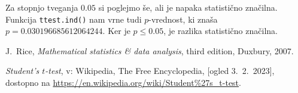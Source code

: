\documentclass[a4paper,11pt]{article}
\begin{document}
Za stopnjo tveganja $0.05$ si poglejmo še, ali je napaka statistično značilna. Funkcija \texttt{ttest.ind()} nam vrne tudi $p$-vrednost, ki znaša $p=0.030196685612064244$. Ker je $p\leq0.05$, je razlika statistično značilna.




\begin{thebibliography}{99}

    J.~Rice, \emph{Mathematical statistics \& data analysis}, third edition, Duxbury, 2007.

    \emph{Student's $t$-test}, v: Wikipedia, The Free Encyclopedia, [ogled 3.~2.~2023], dostopno na \url{https://en.wikipedia.org/wiki/Student%27s_t-test}.
    
\end{thebibliography}
\end{document}
